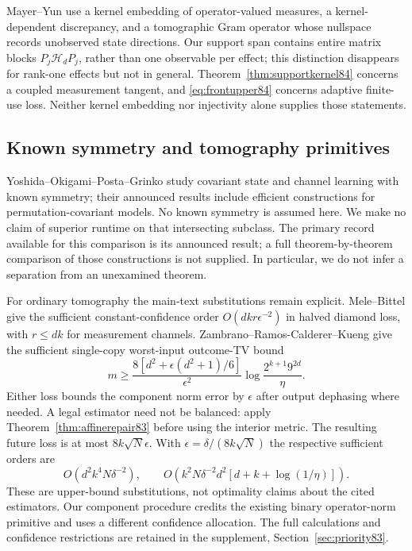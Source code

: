 Mayer--Yun \cite[Theorem~3.6, Definition~3.7 and Remark~4.4]{MY84}
use a kernel embedding of operator-valued measures, a kernel-dependent
discrepancy, and a tomographic Gram operator whose nullspace records
unobserved state directions.  Our support span contains entire
matrix blocks $P_j\mathcal H_dP_j$, rather than one observable
per effect; this distinction disappears for rank-one effects but
not in general.  Theorem~\ref{thm:supportkernel84} concerns a
coupled measurement tangent, and \eqref{eq:frontupper84} concerns
adaptive finite-use loss.  Neither kernel embedding nor injectivity
alone supplies those statements.

\subsection{Known symmetry and tomography primitives}
Yoshida--Okigami--Posta--Grinko \cite{YOPG84} study covariant state
and channel learning with known symmetry; their announced results
include efficient constructions for permutation-covariant models.
No known symmetry is assumed here.  We make no claim of superior
runtime on that intersecting subclass.  The primary record available
for this comparison is its announced result; a full theorem-by-theorem
comparison of those constructions is not supplied.  In particular,
we do not infer a separation from an unexamined theorem.

For ordinary tomography the main-text substitutions remain explicit.
Mele--Bittel \cite[Theorem~III.3]{MB67} give the sufficient
constant-confidence order $O(dkr\epsilon^{-2})$ in halved diamond
loss, with $r\le dk$ for measurement channels.
Zambrano--Ramos-Calderer--Kueng \cite[Theorem~2]{ZRK76} give the
sufficient single-copy worst-input outcome-TV bound
\[
 m\ge\frac{8[d^2+\epsilon(d^2+1)/6]}{\epsilon^2}
          \log\frac{2^{k+1}9^{2d}}{\eta}.
\]
Either loss bounds the component norm error by $\epsilon$ after
output dephasing where needed.  A legal estimator need not be
balanced: apply Theorem~\ref{thm:affinerepair83} before using the
interior metric.  The resulting future loss is at most
$8k\sqrt N\epsilon$.  With $\epsilon=\delta/(8k\sqrt N)$ the
respective sufficient orders are
\[
 O(d^2k^4N\delta^{-2}),\qquad
 O\!\left(k^2N\delta^{-2}d^2[d+k+\log(1/\eta)]\right).
\]
These are upper-bound substitutions, not optimality claims about
the cited estimators.  Our component procedure credits the existing
binary operator-norm primitive and uses a different confidence
allocation.  The full calculations and confidence restrictions
are retained in the supplement, Section~\ref{sec:priority83}.

